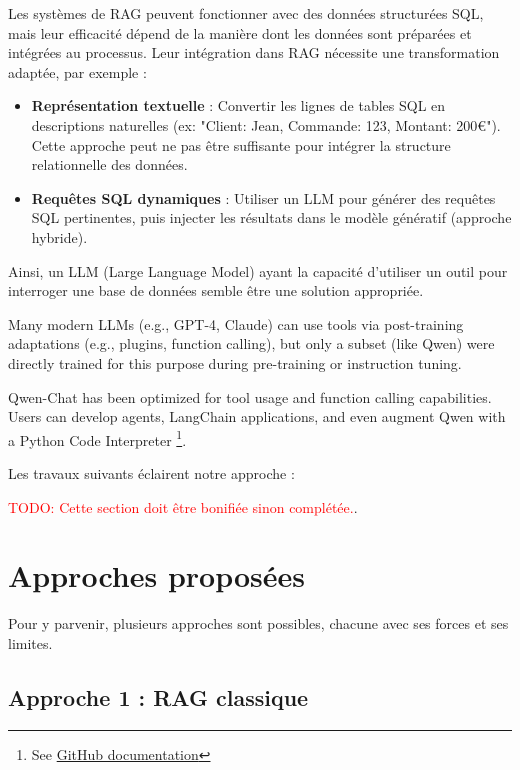 \documentclass[a4paper,11pt]{article}
\begin{document}
Les systèmes de RAG peuvent fonctionner avec des données structurées SQL, mais leur efficacité dépend de la manière dont les données sont préparées et intégrées au processus.
Leur intégration dans RAG nécessite une transformation adaptée, par exemple :

\begin{itemize}
    \item \textbf{Représentation textuelle} : Convertir les lignes de tables SQL en descriptions naturelles (ex: "Client: Jean, Commande: 123, Montant: 200€"). Cette approche peut ne pas être suffisante pour intégrer la structure relationnelle des données.
    \item \textbf{Requêtes SQL dynamiques} : Utiliser un LLM pour générer des requêtes SQL pertinentes, puis injecter les résultats dans le modèle génératif (approche hybride).
\end{itemize}

Ainsi, un LLM (Large Language Model) ayant la capacité d'utiliser un outil pour interroger une base de données 
semble être une solution appropriée.

Many modern LLMs (e.g., GPT-4, Claude) can use tools via post-training adaptations (e.g., plugins, function calling), but only a subset (like Qwen) were directly trained for this purpose during pre-training or instruction tuning. 

Qwen-Chat has been optimized for tool usage and function calling capabilities. Users can develop agents, LangChain applications, and even augment Qwen with a Python Code Interpreter
\footnote{See \href{https://github.com/QwenLM/Qwen/blob/main/README.md}{GitHub documentation}}.


Les travaux suivants éclairent notre approche :

\textcolor{red}{TODO: Cette section doit être bonifiée sinon complétée.}.

\section{Approches proposées}

Pour y parvenir, plusieurs approches sont possibles, chacune avec ses forces et ses limites.

\subsection{Approche 1 : RAG classique}
\end{document}
